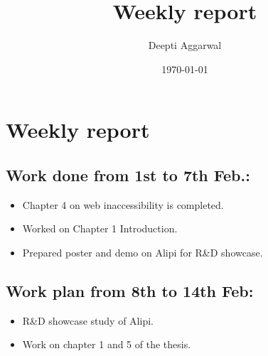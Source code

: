 \documentclass[11pt]{article}
\title{Weekly report}
\author{Deepti Aggarwal}
\date{\today}
\begin{document}
\maketitle

\setcounter{tocdepth}{3}
\vspace*{1cm}
\section{Weekly report}
\label{sec-1}


\subsection{Work done from 1st to 7th Feb.:}
\label{sec-1-2}
\begin{itemize}
\item Chapter 4 on web inaccessibility is completed.
\item Worked on Chapter 1 Introduction.
\item Prepared poster and demo on Alipi for R\&D showcase.
\end{itemize}

\subsection{Work plan from 8th to 14th Feb:}
\label{sec-1-1}
\begin{itemize}
\item R\&D showcase study of Alipi.
\item Work on chapter 1 and 5 of the thesis.
\end{itemize}
\end{document}
